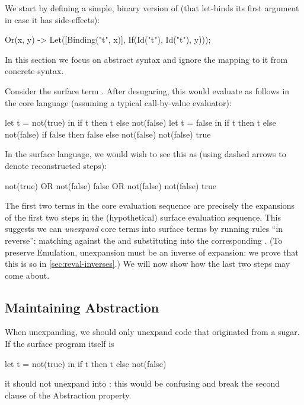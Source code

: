 We start by defining a simple, binary version of  (that
let-binds its first argument in case it has side-effects):
\begin{Codes}
Or(x, y) -> Let([Binding("t", x)],
                If(Id("t"), Id("t"), y)));
\end{Codes}
In this section we focus on abstract syntax and ignore
the mapping to it from concrete syntax.

Consider the surface term . After
desugaring, this would evaluate as follows in the core language
(assuming a typical call-by-value evaluator):
\begin{Codes}
    let t = not(true) in
      if t then t else not(false)
\CoreStep let t = false in
      if t then t else not(false)
\CoreStep if false then false else not(false)
\CoreStep not(false)
\CoreStep true
\end{Codes}
In the surface language, we would wish to see this as (using dashed
arrows to denote reconstructed steps):
\begin{Codes}
    not(true) OR not(false)
\SurfStep false OR not(false)
\SurfStep not(false)
\SurfStep true
\end{Codes}
The first two terms in the core evaluation sequence are precisely the
expansions of the first two steps in the (hypothetical) surface evaluation
sequence. This suggests
we can \emph{unexpand} core terms into surface terms by running rules ``in
reverse'': matching against the  and substituting into the
corresponding .
(To preserve Emulation, unexpansion must be an inverse of expansion: we
prove that this is so in \cref{sec:reval-inverses}.)
We will now show how the last two steps
may come about.

\subsection{Maintaining Abstraction}
\label{sec:reval-exposition-tagging}

When unexpanding, we should only unexpand code that
originated from a sugar. If the surface program itself is
\begin{Codes}
let t = not(true) in
  if t then t else not(false)
\end{Codes}
it should not unexpand into :
this would be confusing and break the second clause of the Abstraction property.

